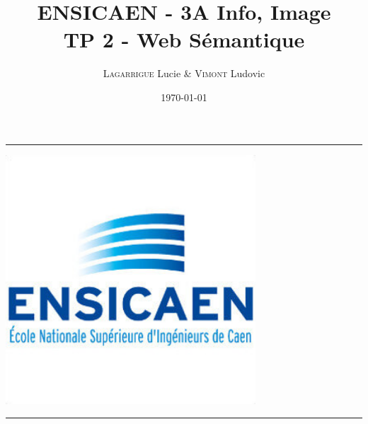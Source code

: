 \documentclass{article}
\title{ENSICAEN - 3A Info, Image\\TP 2 - Web Sémantique}
\author{\textsc{Lagarrigue} Lucie \& \textsc{Vimont} Ludovic}
\date{\today}
\newcommand{\HRule}{\rule{\linewidth}{0.5mm}}
\begin{document}
\begin{titlepage}
	\begin{center}
		\vspace*{\fill}
		\textsc{\Large \@title }
		\HRule
		\vspace{0.5cm}
		\begin{center}
			\includegraphics[width=0.7\textwidth]{../data/logo.jpg}
		\end{center}
		\vspace{0.5cm}
		\HRule \\
		\large{\@author} \\
		\@date
		\vspace*{\fill}
	\end{center}
\end{titlepage}
\end{document}
